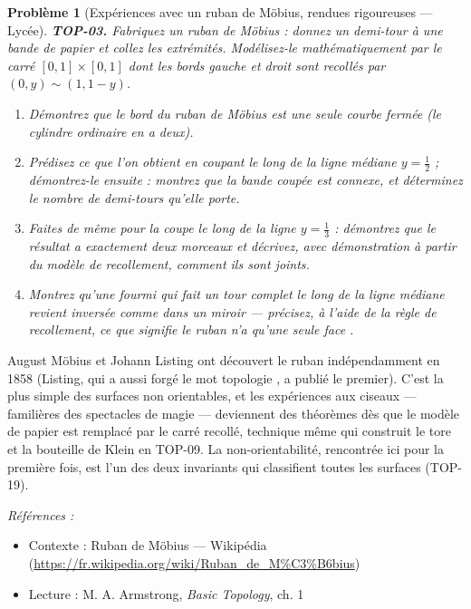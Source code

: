 \documentclass[11pt]{article}
\newtheorem{problem}{Problème}
\newenvironment{refs}{\par\small\noindent\emph{Références :}\begin{itemize}\setlength\itemsep{0pt}}{\end{itemize}\normalsize}
\begin{document}
\bigskip

\begin{problem}[{Expériences avec un ruban de Möbius, rendues rigoureuses --- Lycée}]
\textbf{TOP-03.} Fabriquez un ruban de Möbius : donnez un demi-tour à une bande de papier et collez
les extrémités. Modélisez-le mathématiquement par le carré $ [0,1] \times [0,1] $ dont les bords
gauche et droit sont recollés par $ (0, y) \sim (1, 1-y) $.
\begin{enumerate}
\item[(a)] Démontrez que le bord du ruban de Möbius est une seule courbe fermée (le cylindre ordinaire en a
deux).
\item[(b)] Prédisez ce que l'on obtient en coupant le long de la ligne médiane $ y = \tfrac12 $ ;
démontrez-le ensuite : montrez que la bande coupée est connexe, et déterminez le nombre de demi-tours
qu'elle porte.
\item[(c)] Faites de même pour la coupe le long de la ligne $ y = \tfrac13 $ : démontrez que le résultat a
exactement deux morceaux et décrivez, avec démonstration à partir du modèle de recollement, comment
ils sont joints.
\item[(d)] Montrez qu'une fourmi qui fait un tour complet le long de la ligne médiane revient inversée comme
dans un miroir --- précisez, à l'aide de la règle de recollement, ce que signifie \og{} le ruban n'a qu'une
seule face \fg{}.
\end{enumerate}

\end{problem}

\noindent August Möbius et Johann Listing ont découvert le ruban indépendamment en 1858
(Listing, qui a aussi forgé le mot \og{} topologie \fg{}, a publié le premier). C'est la plus simple des
surfaces non orientables, et les expériences aux ciseaux --- familières des spectacles de magie ---
deviennent des théorèmes dès que le modèle de papier est remplacé par le carré recollé, technique même
qui construit le tore et la bouteille de Klein en TOP-09. La non-orientabilité, rencontrée ici pour la
première fois, est l'un des deux invariants qui classifient toutes les surfaces (TOP-19).

\begin{refs}
\item Contexte : Ruban de Möbius --- Wikipédia (\url{https://fr.wikipedia.org/wiki/Ruban_de_M%C3%B6bius})
\item Lecture : M. A. Armstrong, \textit{Basic Topology}, ch. 1
\end{refs}
\end{document}
